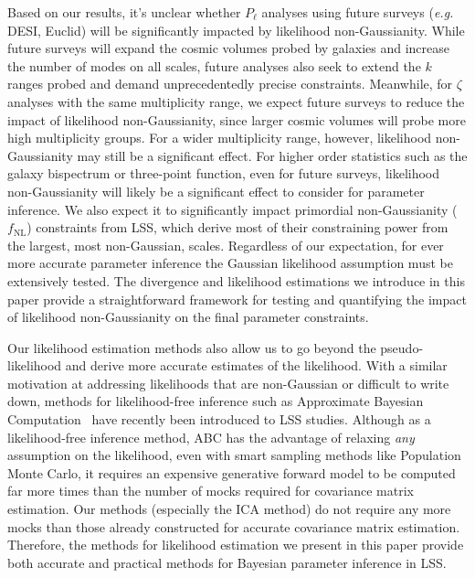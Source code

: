 \documentclass[12pt, letterpaper, preprint]{aastex}
\begin{document}
Based on our results, it's unclear whether $P_\ell$ analyses using future 
surveys (\emph{e.g.} DESI, Euclid) will be significantly impacted by 
likelihood non-Gaussianity. While future surveys will expand the cosmic
volumes probed by galaxies and increase the number of modes on all scales, 
future analyses also seek to extend the $k$ ranges probed and demand
unprecedentedly precise constraints. Meanwhile, for $\zeta$ analyses with 
the same multiplicity range, we expect future surveys to reduce the impact of 
likelihood non-Gaussianity, since larger cosmic volumes will probe more 
high multiplicity groups. For a wider multiplicity range, however, likelihood 
non-Gaussianity may still be a significant effect. For higher order statistics 
such as the galaxy bispectrum or three-point function, even for future surveys, 
likelihood non-Gaussianity will likely be a significant effect to consider for 
parameter inference. We also expect it to significantly impact primordial non-Gaussianity 
($f_\mathrm{NL}$) constraints from LSS, which derive most of their constraining 
power from the largest, most non-Gaussian, scales. Regardless of our expectation, 
for ever more accurate parameter inference the Gaussian likelihood assumption must 
be extensively tested. The divergence and likelihood estimations we introduce in 
this paper provide a straightforward framework for testing and quantifying the 
impact of likelihood non-Gaussianity on the final parameter constraints. 

Our likelihood estimation methods also allow us to go beyond the pseudo-likelihood 
and derive more accurate estimates of the likelihood. With a similar 
motivation at addressing likelihoods that are non-Gaussian or difficult to 
write down, methods for likelihood-free inference such as Approximate Bayesian 
Computation~\citep[ABC;][]{hahn2017b,kacprzak2017,alsing2018} have recently 
been introduced to LSS studies. 
Although as a likelihood-free inference method, ABC has the advantage 
of relaxing \emph{any} assumption on the likelihood, even with smart sampling methods 
like Population Monte Carlo, it requires an expensive generative forward 
model to be computed far more times than the number of mocks required for 
covariance matrix estimation. Our methods (especially the ICA method)
do not require any more mocks than those already constructed for accurate covariance 
matrix estimation. Therefore, the methods for likelihood estimation we present
in this paper provide both accurate and practical methods for Bayesian 
parameter inference in LSS. 
\end{document}
